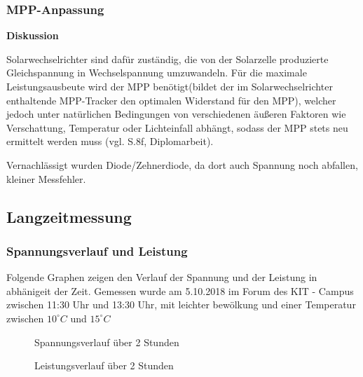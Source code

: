 \documentclass{etit-workshop-protokoll}
\begin{document}
    \subsubsection{MPP-Anpassung}                                       %
        \textbf{Diskussion}
        \newline
        \par Solarwechselrichter sind dafür zuständig, die von der Solarzelle produzierte Gleichspannung in Wechselspannung umzuwandeln. Für die maximale Leistungsausbeute wird der MPP benötigt(bildet der im Solarwechselrichter enthaltende MPP-Tracker den optimalen Widerstand für den MPP), welcher jedoch unter natürlichen Bedingungen von verschiedenen äußeren Faktoren wie Verschattung, Temperatur oder Lichteinfall abhängt, sodass der MPP stets neu ermittelt werden muss (vgl. S.8f, Diplomarbeit). 
        \par Vernachlässigt wurden Diode/Zehnerdiode, da dort auch Spannung noch abfallen, kleiner Messfehler.

\subsection {Langzeitmessung}                                       %
    \subsubsection{Spannungsverlauf und Leistung}                       %
        Folgende Graphen zeigen den Verlauf der Spannung und der Leistung in abhänigeit der Zeit. Gemessen wurde am 5.10.2018 im Forum des KIT - Campus zwischen 11:30 Uhr und 13:30 Uhr, mit leichter bewölkung und einer Temperatur zwischen $10^{\circ}C$ und $15^{\circ}C$
        \begin{figure}[H]
            \def\svgwidth{\textwidth}
            
            
            \caption{Spannungsverlauf über 2 Stunden}
        \end{figure}

        \begin{figure}[H]
            \def\svgwidth{\textwidth}
            
            
            \caption{Leistungsverlauf über 2 Stunden}
        \end{figure}
        
\end{document}
